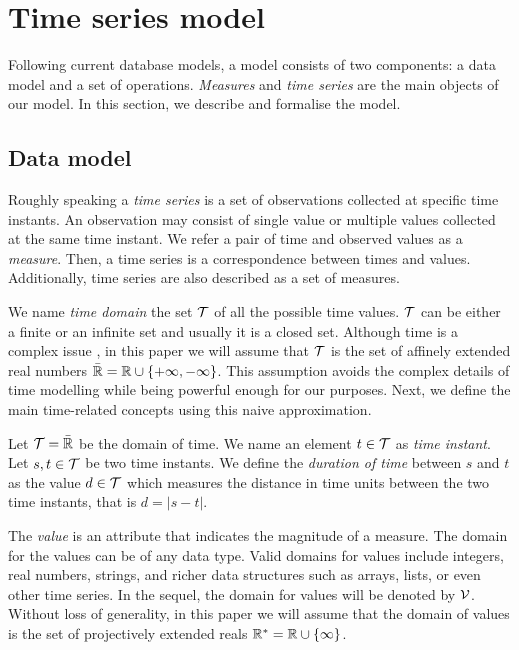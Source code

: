 
\section{Time series model}
\label{sec:model:TSMS}

Following current database models, a  model consists of two
components: a data model and a set of operations. \emph{Measures} and
\emph{time series} are the main objects of our  model.
%
In this section, we describe and formalise the  model. 


\subsection{Data model}

Roughly speaking a \emph{time series} is a set of observations
collected at specific time instants. An observation may consist of
single value or multiple values collected at the same time instant. We
refer a pair of time and observed values as a \emph{measure}. Then, a
time series is a correspondence between times and
values. Additionally, time series are also described as a set of
measures.

We name \emph{time domain} the set $\cal{T}$ of all the possible time
values. $\cal{T}$ can be either a finite or an infinite set and
usually it is a closed set. Although time is a complex issue
\cite{iep:time-supplement}, in this paper we will assume that
$\cal{T}$ is the set of affinely extended real numbers $\bar{\mathbb{R}} = \mathbb{R} \cup
\{+\infty,-\infty\}$. This assumption avoids the complex details of
time modelling while being powerful enough for our purposes. Next, we
define the main time-related concepts using this naive approximation.



\begin{definition}
  \label{def:model:temps}
  Let $\cal{T}=\bar{\mathbb{R}}$ be the domain of time. We name an element
  $t\in\cal{T}$ as \emph{time instant}. Let $s,t\in\cal{T}$ be two
  time instants.  We define the \emph{duration of time} between $s$
  and $t$ as the value $d\in\cal{T}$ which measures the distance in
  time units between the two time instants, that is $d =|s-t|$.
\end{definition}

The \emph{value} is an attribute that indicates the magnitude of a
measure. The domain for the values can be of any data type. Valid
domains for values include integers, real numbers, strings, and richer
data structures such as arrays, lists, or even other time series. In
the sequel, the domain for values will be denoted by
$\cal{V}$. Without loss of generality, in this paper we will assume
that the domain of values is the set of projectively extended reals
$\mathbb{R}^{*} = \mathbb{R} \cup \{\infty\}$.

